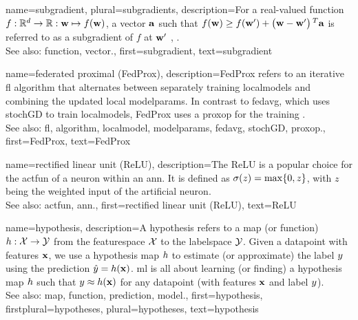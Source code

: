 {name={subgradient}, plural={subgradients},
	description={For a real-valued \gls{function} $f: \mathbb{R}^{d} \rightarrow \mathbb{R}: {\bf w} \mapsto f({\bf w})$, 
		a \gls{vector} ${\bf a}$ such that $f({\bf w}) \geq  f({\bf w}') +\big({\bf w}-{\bf w}' \big)\,^{T} {\bf a}$ is 
		referred to as a subgradient of $f$ at ${\bf w}'$ \cite{BertCvxAnalOpt}, \cite{BertsekasNonLinProgr}.
		\\
		See also: \gls{function}, \gls{vector}.},
	first={subgradient},
	text={subgradient} 
}

{name={federated proximal (FedProx)},
	description={FedProx refers to an iterative \gls{fl} \gls{algorithm} that alternates between separately 
		training \glspl{localmodel} and combining the updated local \gls{modelparams}. In contrast to \gls{fedavg}, which uses 
		\gls{stochGD} to train \glspl{localmodel}, FedProx uses a \gls{proxop} for the training \cite{FedProx2020}.
					\\ 
		See also: \gls{fl}, \gls{algorithm}, \gls{localmodel}, \gls{modelparams}, \gls{fedavg}, \gls{stochGD}, \gls{proxop}.}, 
	first={FedProx}, 
	text={FedProx} 
}

{name={rectified linear unit (ReLU)},
	description={The ReLU is 
		a popular choice for the \gls{actfun} of a neuron within an \gls{ann}. It is defined 
		as $\sigma(z) = \max\{0,z\}$, with $z$ being the weighted input of the artificial 
		neuron.
					\\ 
		See also: \gls{actfun}, \gls{ann}.}, 
	first={rectified linear unit (ReLU)}, 
	text={ReLU} 
}

{name={hypothesis},
	description={A hypothesis refers to a \gls{map} (or \gls{function}) $h: \mathcal{X} \rightarrow \mathcal{Y}$ 
		from the \gls{featurespace} $\mathcal{X}$ to the \gls{labelspace} $\mathcal{Y}$. 
		Given a \gls{datapoint} with \glspl{feature} ${\bf x}$, we use a hypothesis \gls{map} $h$
		to estimate (or approximate) the \gls{label} $y$ using the \gls{prediction}  
		$\hat{y} = h({\bf x})$. \Gls{ml} is all about learning (or finding) a 
		hypothesis \gls{map} $h$ such that $y \approx h({\bf x})$ 
		for any \gls{datapoint} (with \glspl{feature} ${\bf x}$ and \gls{label} $y$).
					\\ 
		See also: \gls{map}, \gls{function}, \gls{prediction}, \gls{model}.},
	first={hypothesis},
	firstplural={hypotheses},
	plural={hypotheses},
	text={hypothesis}  
}


